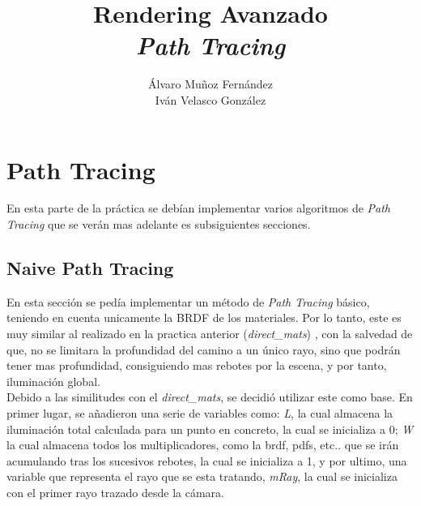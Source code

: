 \documentclass[10pt,oneside,a4paper]{article}
\begin{document}
\begin{titlepage}

\title{\Huge Rendering Avanzado  \\[0.7in] \LARGE \textit{Path Tracing}\\[3.6in]}
\date{}
\author{Álvaro Muñoz Fernández\\
Iván Velasco González}
\maketitle
\thispagestyle{empty}
\end{titlepage}

\section{Path Tracing}
En esta parte de la práctica se debían implementar varios algoritmos de \textit{ Path Tracing} que se verán mas adelante es subsiguientes secciones.
\subsection{Naive Path Tracing}
En esta sección se pedía implementar un método de \textit{Path Tracing} básico, teniendo en cuenta unicamente la BRDF de los materiales. Por lo tanto, este es muy similar al realizado en la practica anterior (\textit{direct\_mats}) , con la salvedad de que, no se limitara la profundidad del camino a un único rayo, sino que podrán tener mas profundidad, consiguiendo mas rebotes por la escena, y por tanto, iluminación global.\\

Debido a las similitudes con el \textit{direct\_mats}, se decidió utilizar este como base. En primer lugar, se añadieron una serie de variables como: \textit{L}, la cual almacena la iluminación total calculada para un punto en concreto, la cual se inicializa a 0; \textit{W} la cual almacena todos los multiplicadores, como la brdf, pdfs, etc.. que se irán acumulando tras los sucesivos rebotes, la cual se inicializa a 1, y por ultimo, una variable que representa el rayo que se esta tratando, \textit{mRay}, la cual se inicializa con el primer rayo trazado desde la cámara.\\
\end{document}
